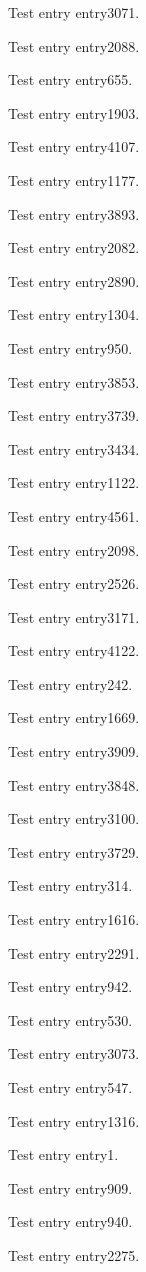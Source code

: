 Test entry \gls{entry3071}.

Test entry \gls{entry2088}.

Test entry \gls{entry655}.

Test entry \gls{entry1903}.

Test entry \gls{entry4107}.

Test entry \gls{entry1177}.

Test entry \gls{entry3893}.

Test entry \gls{entry2082}.

Test entry \gls{entry2890}.

Test entry \gls{entry1304}.

Test entry \gls{entry950}.

Test entry \gls{entry3853}.

Test entry \gls{entry3739}.

Test entry \gls{entry3434}.

Test entry \gls{entry1122}.

Test entry \gls{entry4561}.

Test entry \gls{entry2098}.

Test entry \gls{entry2526}.

Test entry \gls{entry3171}.

Test entry \gls{entry4122}.

Test entry \gls{entry242}.

Test entry \gls{entry1669}.

Test entry \gls{entry3909}.

Test entry \gls{entry3848}.

Test entry \gls{entry3100}.

Test entry \gls{entry3729}.

Test entry \gls{entry314}.

Test entry \gls{entry1616}.

Test entry \gls{entry2291}.

Test entry \gls{entry942}.

Test entry \gls{entry530}.

Test entry \gls{entry3073}.

Test entry \gls{entry547}.

Test entry \gls{entry1316}.

Test entry \gls{entry1}.

Test entry \gls{entry909}.

Test entry \gls{entry940}.

Test entry \gls{entry2275}.

